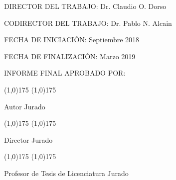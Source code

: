 \vspace{11pt}

DIRECTOR DEL TRABAJO: Dr. Claudio O. Dorso

\vspace{11pt}

CODIRECTOR DEL TRABAJO: Dr. Pablo N. Alcain 

\vspace{11pt}

FECHA DE INICIACIÓN: Septiembre 2018

\vspace{11pt}

FECHA DE FINALIZACIÓN: Marzo 2019

\vspace{11pt}

INFORME FINAL APROBADO POR:

\vspace{4.5cm}

\line(1,0){175} \hspace{60pt} \line(1,0){175}

Autor \hspace{205pt} Jurado

\vspace{2cm}

\line(1,0){175} \hspace{60pt} \line(1,0){175}

Director \hspace{195pt} Jurado

\vspace{2cm}

\line(1,0){175} \hspace{60pt} \line(1,0){175}

Profesor de Tesis de Licenciatura \hspace{75pt} Jurado

\mbox{}
